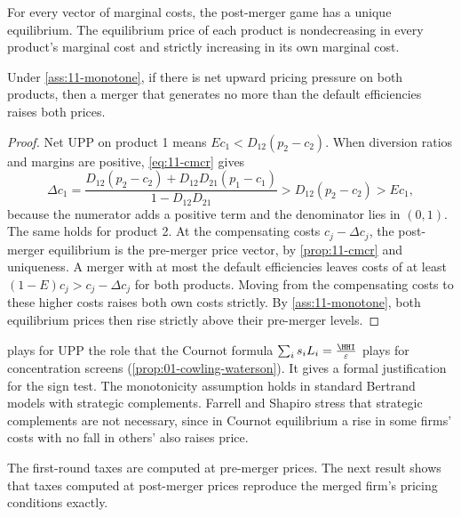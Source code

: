 \begin{assumption}\label{ass:11-monotone}
For every vector of marginal costs, the post-merger game has a unique equilibrium. The equilibrium price of each
product is nondecreasing in every product's marginal cost and strictly increasing in its own marginal cost.
\end{assumption}

\begin{proposition}\label{prop:11-fs1}
Under \cref{ass:11-monotone}, if there is net upward pricing pressure on both products, then a merger that generates no
more than the default efficiencies raises both prices.
\end{proposition}

\begin{proof}
Net UPP on product 1 means $E c_1 < D_{12}(p_2 - c_2)$. When diversion ratios and margins are positive,
\eqref{eq:11-cmcr} gives
\begin{equation*}
  \Delta c_1 = \frac{D_{12}(p_2 - c_2) + D_{12}D_{21}(p_1 - c_1)}{1 - D_{12}D_{21}} > D_{12}(p_2 - c_2) > E c_1 ,
\end{equation*}
because the numerator adds a positive term and the denominator lies in $(0,1)$. The same holds for product 2. At the
compensating costs $c_j - \Delta c_j$, the post-merger equilibrium is the pre-merger price vector, by
\cref{prop:11-cmcr} and uniqueness. A merger with at most the default efficiencies leaves costs of at least
$(1 - E)c_j > c_j - \Delta c_j$ for both products. Moving from the compensating costs to these higher costs raises both
own costs strictly. By \cref{ass:11-monotone}, both equilibrium prices then rise strictly above their pre-merger
levels.
\end{proof}

 plays for UPP the role that the Cournot formula $\sum_i s_i L_i = \frac{\HHI}{\varepsilon}$ plays
for concentration screens (\cref{prop:01-cowling-waterson}). It gives a formal justification for the sign test. The monotonicity
assumption holds in standard Bertrand models with strategic complements. Farrell and Shapiro stress that strategic
complements are not necessary, since in Cournot equilibrium a rise in some firms' costs with no fall in others' also
raises price.

 The first-round taxes are computed at pre-merger prices. The next result
shows that taxes computed at post-merger prices reproduce the merged firm's pricing conditions exactly.

